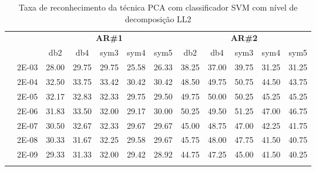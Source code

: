 \begin{table}[H]
\begin{tabular}{|c|c|c c c c c|c c c c c|}
	
	
\\\midrule
\end{tabular}

\end{table}



\begin{table}[H]
	\centering
    \normalsize
	\caption{Taxa de reconhecimento da técnica  PCA com classificador SVM com nível de decomposição LL2}
	\begin{tabular}{|c|c|c c c c c|c c c c c|}
\cline{3-12}
\multicolumn{2}{c|}{\multirow{2}{*}{}} & \multicolumn{5}{c|}{\textbf{AR\#1}}  & \multicolumn{5}{c|}{\textbf{AR\#2}} \\\cline{3-12}

\multicolumn{2}{c|}{}  & db2 & db4 & sym3 & sym4 & sym5 & db2 & db4& sym3 & sym4 & sym5 \\\hline
\multicolumn{1}{|c|}{ \multirow{6}{*}{\rotatebox[origin=c]{90}{\textbf{Gamma}}} }
&2E-03&	28.00&	29.75&	29.75&	25.58&	26.33&	38.25&	37.00&	39.75&	31.25&	31.25	\\\cline{2-12}
&2E-04&	32.50&	33.75&	33.42&	30.42&	30.42&	48.50&	49.75&	50.75&	44.50&	43.75	\\\cline{2-12}
&2E-05&	32.17&	32.83&	32.33&	29.75&	29.50&	49.75&	50.00&	50.25&	45.25&	45.25	\\\cline{2-12}
&2E-06&	31.83&	33.50&	32.00&	29.17&	30.00&	50.25&	49.50&	51.25&	47.00&	46.75	\\\cline{2-12}
&2E-07&	30.50&	32.67&	32.33&	29.67&	29.67&	45.00&	48.75&	47.00&	42.25&	41.75	\\\cline{2-12}
&2E-08&	30.33&	31.67&	32.25&	29.58&	29.67&	45.75&	48.00&	47.75&	41.50&	40.75	\\\cline{2-12}
&2E-09&	29.33&	31.33&	32.00&	29.42&	28.92&	44.75&	47.25&	45.00&	41.50&	40.25	
	



\\ \midrule
\multicolumn{12}{c}{}\\ 


\end{tabular}
\end{table}
